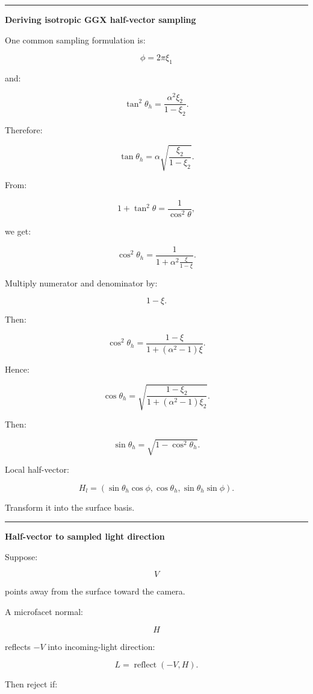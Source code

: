 \begin{center}\rule{0.5\linewidth}{0.5pt}\end{center}

\textbf{Deriving isotropic GGX half-vector sampling}

One common sampling formulation is:

\[
\phi=2\pi\xi_1
\]

and:

\[
\tan^2\theta_h
=
\frac{
\alpha^2\xi_2
}{
1-\xi_2
}.
\]

Therefore:

\[
\tan\theta_h
=
\alpha
\sqrt{
\frac{\xi_2}{1-\xi_2}
}.
\]

From:

\[
1+\tan^2\theta
=
\frac1{\cos^2\theta},
\]

we get:

\[
\cos^2\theta_h
=
\frac1{
1+
\alpha^2
\frac{\xi}{1-\xi}
}.
\]

Multiply numerator and denominator by:

\[
1-\xi.
\]

Then:

\[
\boxed{
\cos^2\theta_h
=
\frac{
1-\xi
}{
1+(\alpha^2-1)\xi
}.
}
\]

Hence:

\[
\boxed{
\cos\theta_h
=
\sqrt{
\frac{
1-\xi_2
}{
1+(\alpha^2-1)\xi_2
}
}.
}
\]

Then:

\[
\sin\theta_h
=
\sqrt{
1-\cos^2\theta_h
}.
\]

Local half-vector:

\[
H_l=
(
\sin\theta_h\cos\phi,
\cos\theta_h,
\sin\theta_h\sin\phi
).
\]

Transform it into the surface basis.

\begin{center}\rule{0.5\linewidth}{0.5pt}\end{center}

\textbf{Half-vector to sampled light direction}

Suppose:

\[
V
\]

points away from the surface toward the camera.

A microfacet normal:

\[
H
\]

reflects \(-V\) into incoming-light direction:

\[
\boxed{
L=
\operatorname{reflect}(-V,H).
}
\]

Then reject if:

